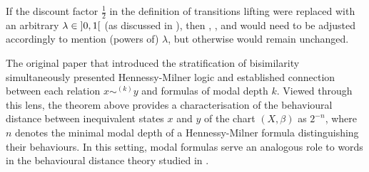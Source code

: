 \begin{remark}
If the discount factor $\frac{1}{2}$ in the definition of transitions lifting were replaced with an arbitrary $\lambda \in \interval[open]{0}{1}$ (as discussed in ), then , ,  and  would need to be adjusted accordingly to mention (powers of) $\lambda$, but otherwise would remain unchanged.
\end{remark}
\begin{remark}
The original paper that introduced the stratification of bisimilarity~\cite{hennessy:1985:algebraic} simultaneously presented Hennessy-Milner logic and established connection between each relation $x \sim^{(k)} y$ and formulas of modal depth $k$. Viewed through this lens, the theorem above provides a characterisation of the behavioural distance between inequivalent states $x$ and $y$ of the chart $(X, \beta)$ as $2^{-n}$, where $n$ denotes the minimal modal depth of a Hennessy-Milner formula distinguishing their behaviours. In this setting, modal formulas serve an analogous role to words in the behavioural distance theory studied in .
	\end{remark}
